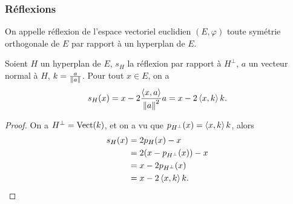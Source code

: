 \subsubsection{Réflexions}

\begin{defdef}
  On appelle réflexion de l'espace vectoriel euclidien \((E,\varphi)\) toute symétrie orthogonale de \(E\) par rapport à un hyperplan de \(E\).
\end{defdef}
\begin{prop}
  Soient \(H\) un hyperplan de \(E\), \(s_H\) la réflexion par rapport à \(H^\perp\), \(a\) un vecteur normal à \(H\), \(k=\frac{a}{\left\lVert a\right\rVert}\). Pour tout \(x \in E\), on a
  \begin{equation}
    s_H(x)=x-2\frac{\left\langle{x},{a}\right\rangle}{\left\lVert a\right\rVert^2}a = x-2\left\langle{x},{k}\right\rangle k.
  \end{equation}
\end{prop}
\begin{proof}
  On a \(H^\perp = \operatorname{Vect}(k)\), et on a vu que \(p_{H^\perp}(x)=\left\langle{x},{k}\right\rangle k\), alors
  \begin{align}
    s_{H}(x)&=2p_H(x)-x\\
            &=2(x-p_{H^\perp}(x))-x\\
            &=x-2p_{H^\perp}(x)\\
            &=x-2\left\langle{x},{k}\right\rangle k.
  \end{align}
\end{proof}

